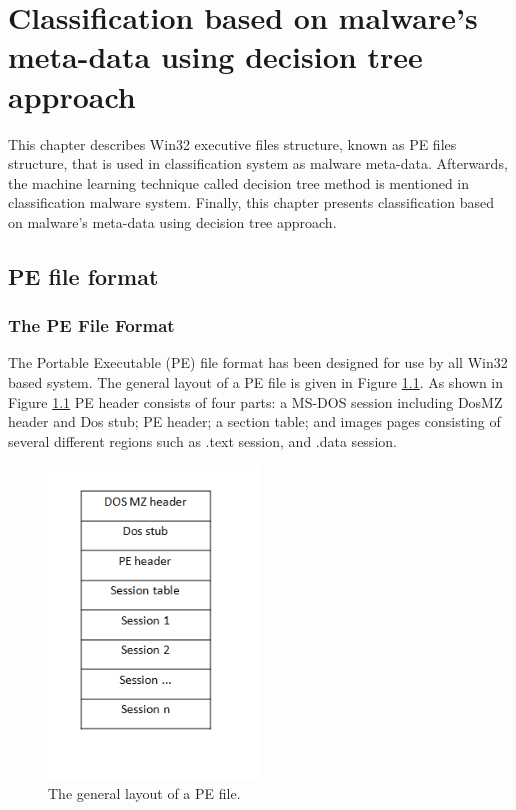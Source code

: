 \chapter{Classification based on malware's meta-data using decision tree approach}\label{chap:4}
%
%
This chapter describes Win32 executive files structure, known as PE files structure, that is used in classification system as malware meta-data. Afterwards, the machine learning technique called decision tree method is mentioned in classification malware system. Finally, this chapter presents classification based on malware's meta-data using decision tree approach. 

\section{PE file format\cite{peheaderci}}
\subsection{The PE File Format}

The Portable Executable (PE) file format has been designed for use by all Win32 based system. The general layout of a PE file is given in Figure \ref{fig:pefiles}. As shown in Figure \ref{fig:pefiles} PE header consists of four parts: a MS-DOS session including DosMZ header and Dos stub; PE header; a section table; and images pages consisting of several different regions such as .text session, and .data session.
\begin{figure}[h!]
\centering
\includegraphics[width=0.5\textwidth]{graph/pefiles.png}
\caption{The general layout of a PE file.}
\label{fig:pefiles}
\end{figure}

